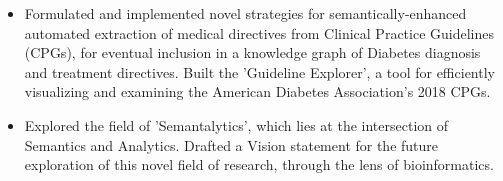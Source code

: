 \documentclass[10pt]{article}
\newcommand{\tabularxwidth}{\textwidth}
\begin{document}
\begin{minipage}{\tabularxwidth}
\begin{itemize}[noitemsep, topsep=3pt, parsep=0pt, partopsep=0pt]
                \item 
    Formulated and implemented novel strategies for semantically-enhanced automated extraction of medical directives from Clinical Practice Guidelines (CPGs), for eventual inclusion in a knowledge graph of Diabetes diagnosis and treatment directives. Built the 'Guideline Explorer', a tool for efficiently visualizing and examining the American Diabetes Association's 2018 CPGs.
            
                \item 
    Explored the field of 'Semantalytics', which lies at the intersection of Semantics and Analytics. Drafted a Vision statement for the future exploration of this novel field of research, through the lens of bioinformatics.
            
        \end{itemize}

        
            \vspace{.3em}
        

    \end{minipage}
    
\end{document}
